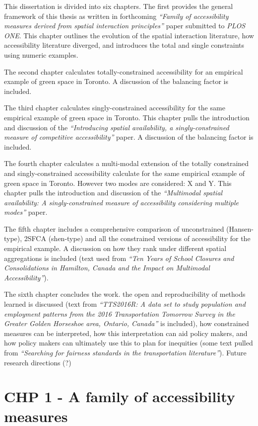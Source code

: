\documentclass[
11pt, %
oneside, %
english, %
singlespacing, %
]{macthesis} %
\begin{document}
This dissertation is divided into six chapters. The first provides the general framework of this thesis as written in forthcoming \emph{``Family of accessibility measures derived from spatial interaction principles''} paper submitted to \emph{PLOS ONE}. This chapter outlines the evolution of the spatial interaction literature, how accessibility literature diverged, and introduces the total and single constraints using numeric examples.

The second chapter calculates totally-constrained accessibility for an empirical example of green space in Toronto. A discussion of the balancing factor is included.

The third chapter calculates singly-constrained accessibility for the same empirical example of green space in Toronto. This chapter pulls the introduction and discussion of the \emph{``Introducing spatial availability, a singly-constrained measure of competitive accessibility''} paper. A discussion of the balancing factor is included.

The fourth chapter calculates a multi-modal extension of the totally constrained and singly-constrained accessibility calculate for the same empirical example of green space in Toronto. However two modes are considered: X and Y. This chapter pulls the introduction and discussion of the \emph{``Multimodal spatial availability: A singly-constrained measure of accessibility considering multiple modes''} paper.

The fifth chapter includes a comprehensive comparison of unconstrained (Hansen-type), 2SFCA (shen-type) and all the constrained versions of accessibility for the empirical example. A discussion on how they rank under different spatial aggregations is included (text used from \emph{``Ten Years of School Closures and Consolidations in Hamilton, Canada and the Impact on Multimodal Accessibility''}).

The sixth chapter concludes the work. the open and reproducibility of methods learned is discussed (text from \emph{``TTS2016R: A data set to study population and employment patterns from the 2016 Transportation Tomorrow Survey in the Greater Golden Horseshoe area, Ontario, Canada''} is included), how constrained measures can be interpreted, how this interpretation can aid policy makers, and how policy makers can ultimately use this to plan for inequities (some text pulled from \emph{``Searching for fairness standards in the transportation literature''}). Future research directions (?)

\chapter{CHP 1 - A family of accessibility measures}\label{chp-1---a-family-of-accessibility-measures}
\end{document}
